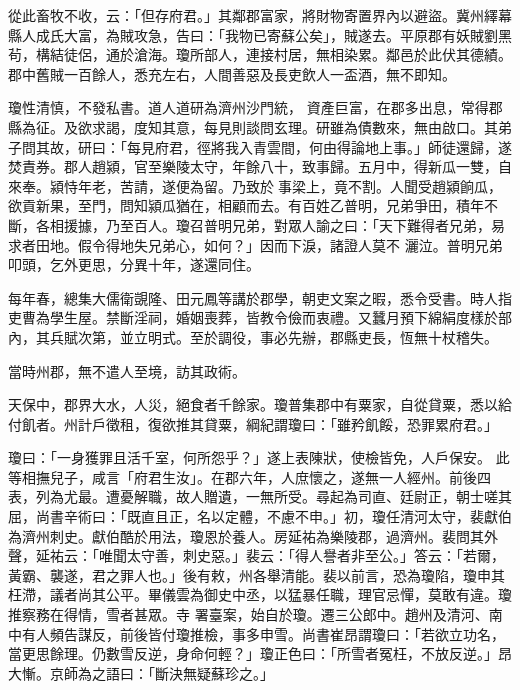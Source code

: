 \begin{pinyinscope}
 從此畜牧不收，云：「但存府君。」其鄰郡富家，將財物寄置界內以避盜。冀州繹幕縣人成氏大富，為賊攻急，告曰：「我物已寄蘇公矣」，賊遂去。平原郡有妖賊劉黑茍，構結徒侶，通於滄海。瓊所部人，連接村居，無相染累。鄰邑於此伏其德績。郡中舊賊一百餘人，悉充左右，人間善惡及長吏飲人一盃酒，無不即知。



 瓊性清慎，不發私書。道人道研為濟州沙門統，
 資產巨富，在郡多出息，常得郡縣為征。及欲求謁，度知其意，每見則談問玄理。研雖為債數來，無由啟口。其弟子問其故，研曰：「每見府君，徑將我入青雲間，何由得論地上事。」師徒還歸，遂焚責券。郡人趙潁，官至樂陵太守，年餘八十，致事歸。五月中，得新瓜一雙，自來奉。潁恃年老，苦請，遂便為留。乃致於事梁上，竟不割。人聞受趙潁餉瓜，欲貢新果，至門，問知潁瓜猶在，相顧而去。有百姓乙普明，兄弟爭田，積年不斷，各相援據，乃至百人。瓊召普明兄弟，對眾人諭之曰：「天下難得者兄弟，易求者田地。假令得地失兄弟心，如何？」因而下淚，諸證人莫不
 灑泣。普明兄弟叩頭，乞外更思，分異十年，遂還同住。



 每年春，總集大儒衛覬隆、田元鳳等講於郡學，朝吏文案之暇，悉令受書。時人指吏曹為學生屋。禁斷淫祠，婚姻喪葬，皆教令儉而衷禮。又蠶月預下綿絹度樣於部內，其兵賦次第，並立明式。至於調役，事必先辦，郡縣吏長，恆無十杖稽失。



 當時州郡，無不遣人至境，訪其政術。



 天保中，郡界大水，人災，絕食者千餘家。瓊普集郡中有粟家，自從貸粟，悉以給付飢者。州計戶徵租，復欲推其貸粟，綱紀謂瓊曰：「雖矜飢餒，恐罪累府君。」



 瓊曰：「一身獲罪且活千室，何所怨乎？」遂上表陳狀，使檢皆免，人戶保安。
 此等相撫兒子，咸言「府君生汝」。在郡六年，人庶懷之，遂無一人經州。前後四表，列為尤最。遭憂解職，故人贈遺，一無所受。尋起為司直、廷尉正，朝士嗟其屈，尚書辛術曰：「既直且正，名以定體，不慮不申。」初，瓊任清河太守，裴獻伯為濟州刺史。獻伯酷於用法，瓊恩於養人。房延祐為樂陵郡，過濟州。裴問其外聲，延祐云：「唯聞太守善，刺史惡。」裴云：「得人譽者非至公。」答云：「若爾，黃霸、襲遂，君之罪人也。」後有敕，州各舉清能。裴以前言，恐為瓊陷，瓊申其枉滯，議者尚其公平。畢儀雲為御史中丞，以猛暴任職，理官忌憚，莫敢有違。瓊推察務在得情，雪者甚眾。寺
 署臺案，始自於瓊。遷三公郎中。趙州及清河、南中有人頻告謀反，前後皆付瓊推檢，事多申雪。尚書崔昂謂瓊曰：「若欲立功名，當更思餘理。仍數雪反逆，身命何輕？」瓊正色曰：「所雪者冤枉，不放反逆。」昂大慚。京師為之語曰：「斷決無疑蘇珍之。」




\end{pinyinscope}
